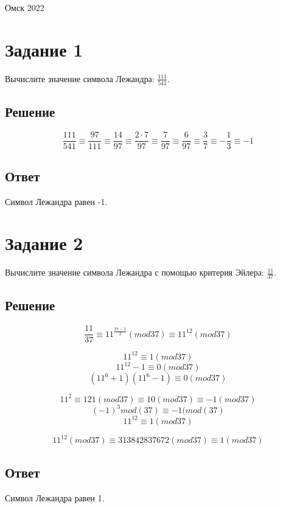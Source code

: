 \documentclass[14pt, a4paper]{article}
\begin{document}
    \vspace*{\fill}
    \begin{center}
        Омск 2022
    \end{center}

    \newpage

    \section*{Задание 1}
    Вычислите значение символа Лежандра: $\frac{111}{541}$.

    \subsection*{Решение}
    
    \[ \frac{111}{541} \equiv \frac{97}{111} \equiv \frac{14}{97} \equiv \frac{2 \cdot 7}{97} \equiv \frac{7}{97} \equiv \frac{6}{97} \equiv \frac{3}{7} \equiv -\frac{1}{3} \equiv -1 \]

    \subsection*{Ответ}
    Символ Лежандра равен -1.

    \vspace{2cm}
    \section*{Задание 2}
    Вычислите значение символа Лежандра с помощью критерия Эйлера: $\frac{11}{37}$.

    \subsection*{Решение}

    \[ \frac{11}{37} \equiv 11^{\frac{37 - 1}{2}}(mod37) \equiv 11^{12}(mod37) \]

    \[ 11^{12} \equiv 1(mod37) \]
    \[ 11^{12} - 1 \equiv 0(mod37) \]
    \[ (11^{6} + 1)(11^{6} - 1) \equiv 0(mod37) \]
    
    \[ 11^{2} \equiv 121(mod37) \equiv 10(mod37) \equiv -1(mod37) \]
    \[ (-1)^{3}mod(37) \equiv -1(mod(37) \]
    \[ 11^{12} \equiv 1(mod37) \]

    \[ 11^{12}(mod37) \equiv 313842837672(mod37) \equiv 1(mod37) \]

    \subsection*{Ответ}
    Символ Лежандра равен 1.
\end{document}
